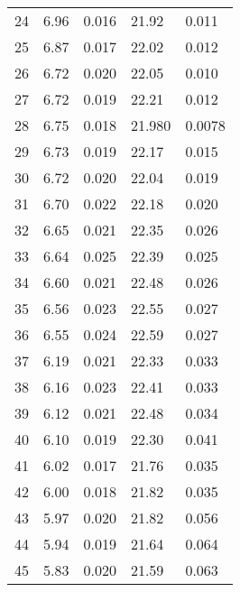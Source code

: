 \begin{table}
\begin{tabular}{c|ll|ll}
24 & 6.96 & 0.016 & 21.92 & 0.011 \\
25 & 6.87 & 0.017 & 22.02 & 0.012 \\
26 & 6.72 & 0.020 & 22.05 & 0.010 \\
27 & 6.72 & 0.019 & 22.21 & 0.012 \\
28 & 6.75 & 0.018 & 21.980 & 0.0078 \\
29 & 6.73 & 0.019 & 22.17 & 0.015 \\
30 & 6.72 & 0.020 & 22.04 & 0.019 \\
31 & 6.70 & 0.022 & 22.18 & 0.020 \\
32 & 6.65 & 0.021 & 22.35 & 0.026 \\
33 & 6.64 & 0.025 & 22.39 & 0.025 \\
34 & 6.60 & 0.021 & 22.48 & 0.026 \\
35 & 6.56 & 0.023 & 22.55 & 0.027 \\
36 & 6.55 & 0.024 & 22.59 & 0.027 \\
37 & 6.19 & 0.021 & 22.33 & 0.033 \\
38 & 6.16 & 0.023 & 22.41 & 0.033 \\
39 & 6.12 & 0.021 & 22.48 & 0.034 \\
40 & 6.10 & 0.019 & 22.30 & 0.041 \\
41 & 6.02 & 0.017 & 21.76 & 0.035 \\
42 & 6.00 & 0.018 & 21.82 & 0.035 \\
43 & 5.97 & 0.020 & 21.82 & 0.056 \\
44 & 5.94 & 0.019 & 21.64 & 0.064 \\
45 & 5.83 & 0.020 & 21.59 & 0.063 \\
               \hline
        \end{tabular}
    \end{table}
    \clearpage

